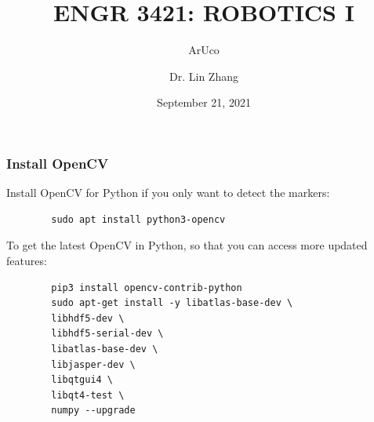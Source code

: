 \documentclass[12pt,letterpaper]{beamer}
\title[Robotics I]
{ENGR 3421: ROBOTICS I}
\subtitle{ArUco}
\author[Zhang, Lin]
{Dr. Lin Zhang}
\institute[UCA] %
{
  Department of Physics and Astronomy\\
  University of Central Arkansas
}
\date[Robotics1 2021] %
{September 21, 2021}
\begin{document}
\frame{\titlepage}



\begin{frame}[fragile]
\frametitle{Install OpenCV}

Install OpenCV for Python if you only want to detect the markers:
{\scriptsize
    \begin{verbatim}
        sudo apt install python3-opencv
    \end{verbatim}
}

To get the latest OpenCV in Python, so that you can access more updated features:
{\scriptsize
    \begin{verbatim}
        pip3 install opencv-contrib-python 
        sudo apt-get install -y libatlas-base-dev \
        libhdf5-dev \
        libhdf5-serial-dev \
        libatlas-base-dev \
        libjasper-dev \
        libqtgui4 \
        libqt4-test \
        numpy --upgrade
    \end{verbatim}
}
\end{frame}
\end{document}
